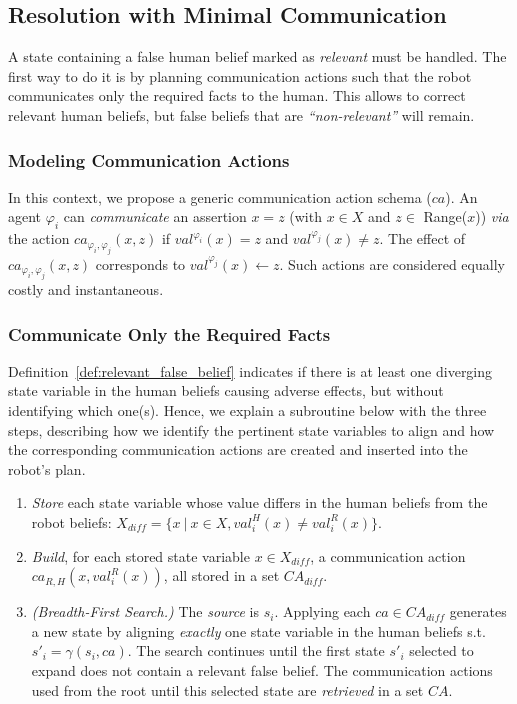 {    \subsection{Resolution with Minimal Communication}

A state containing a false human belief marked as \textit{relevant} must be handled. 
The first way to do it is by planning communication actions such that the robot communicates only the required facts to the human. This allows to correct relevant human beliefs, but false beliefs that are \textit{``non-relevant''} will remain. 

\subsubsection{Modeling Communication Actions} 
In this context, we propose a generic communication action schema ($ca$). 
An agent $\varphi_i$ can \textit{communicate} an assertion $x=z$ (with $x \in X$ and $z \in$ Range($x$)) \textit{via} the action $ca_{\varphi_i, \varphi_j}(x,z)$ if $val^{\varphi_i}(x) = z$ and $val^{\varphi_j}(x) \neq z$.
The effect of $ca_{\varphi_i, \varphi_j}(x,z)$ corresponds to $val^{\varphi_j}(x) \leftarrow z$. Such actions are considered equally costly and instantaneous.

\subsubsection{Communicate Only the Required Facts}
Definition~\ref{def:relevant_false_belief} indicates if there is at least one diverging state variable in the human beliefs causing adverse effects, but without identifying which one(s).
Hence, we explain a subroutine below with the three steps, describing how we identify the pertinent state variables to align and how the corresponding communication actions are created and inserted into the robot's plan.

\begin{enumerate}
    \item 
    \textit{Store} each state variable whose value differs in the human beliefs from the robot beliefs: $X_{diff} = \{ x ~|~ x\in X, val^H_i(x) \neq val^R_i(x) \}$.

    \item
    \textit{Build}, for each stored state variable $x \in X_{diff}$, a communication action $ca_{R, H}(x,val^R_i(x))$, all stored in a set $\mathit{CA}_{diff}$.

    \item 
    \textit{(Breadth-First Search.)} 
    The \textit{source} is $s_i$. Applying each $ca \in \mathit{CA}_{diff}$ generates a new state by aligning \textit{exactly} one state variable in the human beliefs s.t. $s'_i = \gamma(s_i, ca )$. 
    The search continues until the first state $s'_i$ selected to expand does not contain a relevant false belief. The communication actions used from the root until this selected state are \textit{retrieved} in a set $\mathit{CA}$.
\end{enumerate}

}
